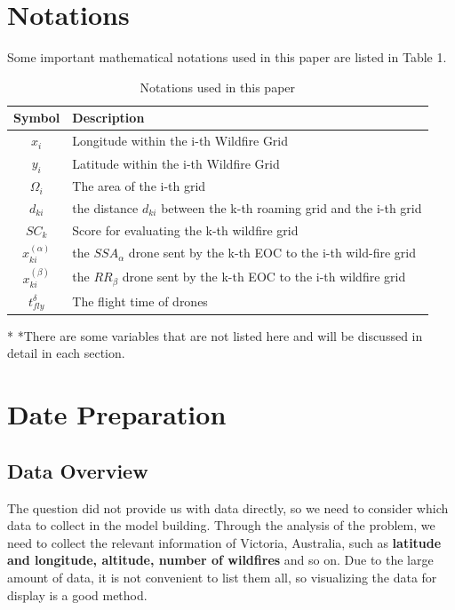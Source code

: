\documentclass[12pt]{article}  %
\begin{document}
\section{Notations}
Some important mathematical notations used in this paper are listed in Table 1. 
\begin{table}[htbp]
\begin{center}
\caption{Notations used in this paper}
\begin{tabular}{c l}
\toprule[2pt]
\multicolumn{1}{m{3cm}}{\centering Symbol}
&\multicolumn{1}{m{8cm}}{\centering Description }\\
\midrule
$x_i$& Longitude within the i-th Wildfire Grid \\
$y_i$& Latitude within the i-th Wildfire Grid \\
$\varOmega _i$& The area of the i-th grid\\
$d_{ki}$& the distance $d_{ki}$ between the k-th roaming grid and the i-th grid \\
$SC_k$ & Score for evaluating the k-th wildfire grid \\
\vspace{5pt}%
$x^{( \alpha )}_{ki}$ & the $SSA_\alpha$ drone sent by the k-th EOC to the i-th wild-fire grid\\
\vspace{3pt}
$x^{( \beta )}_{ki}$ & the $RR_\beta$ drone sent by the k-th EOC to the i-th wildfire grid\\
$t_{fly}^{\delta}$ & The flight time of drones\\
\bottomrule[2pt]
\end{tabular}\label{tb:notation}
 \begin{tablenotes}
        \footnotesize
        \item[*] *There are some variables that are not listed here and will be discussed in detail in each section. %
      \end{tablenotes}
\end{center}
\end{table}
\vspace{-1cm}%

\section{Date Preparation}
\subsection{Data Overview}
The question did not provide us with data directly, so we need to consider which data to collect in the model building. Through the analysis of the problem, we need to collect the relevant information of Victoria, Australia, such as \textbf{latitude and longitude, altitude, number of wildfires} and so on. Due to the large amount of data, it is not convenient to list them all, so visualizing the data for display is a good method.
\end{document}
